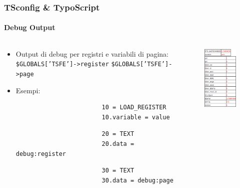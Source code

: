 \begin{frame}[fragile]
	\frametitle{TSconfig \& TypoScript}
	\framesubtitle{Debug Output}

	\begin{columns}[T]

		\begin{column}{.6\textwidth}
			\begin{itemize}
				\item Output di debug per registri e variabili di pagina:\newline
					\texttt{\$GLOBALS['TSFE']->register}\newline
					\texttt{\$GLOBALS['TSFE']->page}

				\item Esempi:

					\begin{lstlisting}
						10 = LOAD_REGISTER
						10.variable = value
					\end{lstlisting}

					\begin{lstlisting}
						20 = TEXT
						20.data = debug:register
					\end{lstlisting}

					\begin{lstlisting}
						30 = TEXT
						30.data = debug:page
					\end{lstlisting}

			\end{itemize}
		\end{column}

		\begin{column}{.4\textwidth}
			\begin{figure}\vspace*{-0.4cm}
				\includegraphics[width=0.6\linewidth]{Images/TypoScript/DebugRegisterAndPage.png}
			\end{figure}
		\end{column}


\end{columns}
\end{frame}
